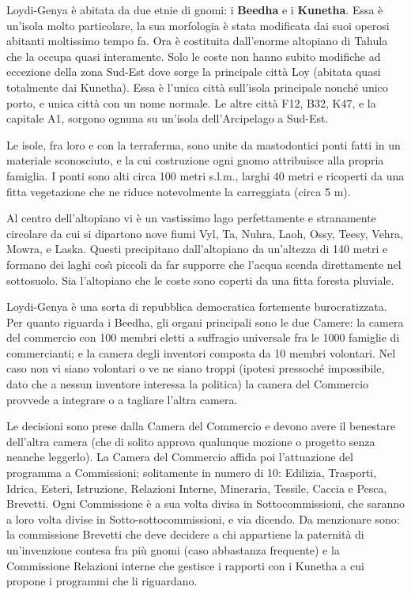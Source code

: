\Geografia Loydi-Genya \`e abitata da due etnie di gnomi: i \textbf{Beedha} e i
\textbf{Kunetha}.  Essa \`e un'isola molto particolare, la sua morfologia \`e
stata modificata dai suoi operosi abitanti moltissimo tempo fa. Ora
\`e costituita dall'enorme altopiano di Tahula che la occupa quasi
interamente. Solo le coste non hanno subito modifiche ad eccezione
della zona Sud-Est dove sorge la principale citt\`a Loy (abitata quasi
totalmente dai Kunetha). Essa \`e l'unica citt\`a sull'isola
principale nonch\'e unico porto, e unica citt\`a con un nome normale.
Le altre citt\`a F12, B32, K47, e la capitale A1, sorgono ognuna su
un'isola dell'Arcipelago a Sud-Est.

Le isole, fra loro e con la terraferma, sono unite da
mastodontici ponti fatti in un materiale sconosciuto, e la cui
costruzione ogni gnomo attribuisce alla propria famiglia. I ponti sono
alti circa 100 metri s.l.m., larghi 40 metri e ricoperti da una fitta
vegetazione che ne riduce notevolmente la carreggiata (circa 5 m).

Al centro dell'altopiano vi \`e un vastissimo lago perfettamente e stranamente
circolare da cui si dipartono nove fiumi Vyl, Ta, Nuhra, Laoh, Ossy,
Teesy, Vehra, Mowra, e Laska. Questi precipitano dall'altopiano da
un'altezza di 140 metri e formano dei laghi cos\`{\i}  piccoli da far
supporre che l'acqua scenda direttamente nel sottosuolo. Sia
l'altopiano che le coste sono coperti da una fitta foresta pluviale.

\Politica Loydi-Genya \`e una sorta di repubblica democratica
fortemente burocratizzata.  Per quanto riguarda i Beedha, gli
organi principali sono le due Camere: la camera del commercio con 100
membri eletti a suffragio universale fra le 1000 famiglie di
commercianti; e la camera degli inventori composta da 10 membri
volontari. Nel caso non vi siano volontari o ve ne siano troppi
(ipotesi pressoch\'e impossibile, dato che a nessun inventore
interessa la politica) la camera del Commercio provvede a integrare o
a tagliare l'altra camera.

Le decisioni sono prese dalla Camera del Commercio e devono avere il
benestare dell'altra camera (che di solito approva qualunque mozione o
progetto senza neanche leggerlo).  La Camera del Commercio affida poi
l'attuazione del programma a Commissioni; solitamente in numero di 10:
Edilizia, Trasporti, Idrica, Esteri, Istruzione, Relazioni Interne,
Mineraria, Tessile, Caccia e Pesca, Brevetti. Ogni Commissione \`e a
sua volta divisa in Sottocommissioni, che saranno a loro volta divise
in Sotto-sottocommissioni, e via dicendo. Da menzionare sono: la
commissione Brevetti che deve decidere a chi appartiene la paternit\`a
di un'invenzione contesa fra pi\`u gnomi (caso abbastanza
frequente) e la Commissione Relazioni interne che gestisce i rapporti
con i Kunetha a cui propone i programmi che li riguardano.

